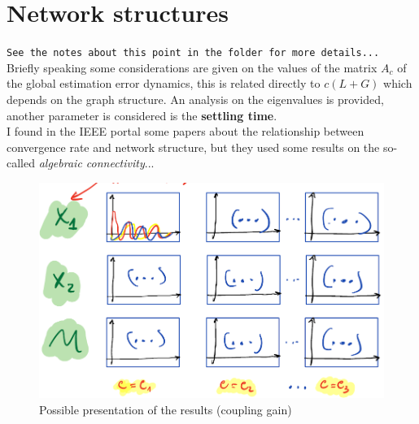 \documentclass[a4paper,11pt]{article}
\begin{document}
    \section*{Network structures}
    \texttt{See the notes about this point in the folder for more details...}\\
    \textsf{
    Briefly speaking some considerations are given on the values of the matrix $A_c$ of the global estimation error dynamics, this is related directly to $c(L+G)$ which depends on the graph structure. An analysis on the eigenvalues is provided, another parameter is considered is the \textbf{settling time}.\\
    I found in the IEEE portal some papers about the relationship between convergence rate and network structure, but they used some results on the so-called \textit{algebraic connectivity}...}
    \begin{figure}[h]
        \centering
        \includegraphics[scale=0.6]{img/figCoupling.png}
        \caption{Possible presentation of the results (coupling gain)}
    \end{figure}
\end{document}
